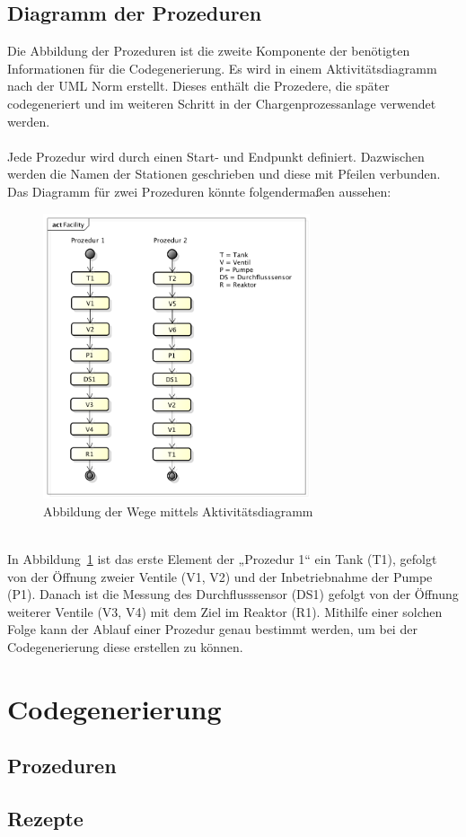 
\subsection{Diagramm der Prozeduren}
Die Abbildung der Prozeduren ist die zweite Komponente der benötigten Informationen für die Codegenerierung. Es wird in einem Aktivitätsdiagramm nach der UML Norm erstellt. Dieses enthält die Prozedere, die später codegeneriert und im weiteren Schritt in der Chargenprozessanlage verwendet werden. \\\\
Jede Prozedur wird durch einen Start- und Endpunkt definiert. Dazwischen werden die Namen der Stationen geschrieben und diese mit Pfeilen verbunden. Das Diagramm für zwei Prozeduren könnte folgendermaßen aussehen: 
\begin{figure}[h!]
		\centering
		\includegraphics[width=0.7\textwidth]{graphics/konzept/UML_Activity.png}
		\caption{Abbildung der Wege mittels Aktivitätsdiagramm}
		\label{fig:konz_UML_Activity}
\end{figure}\\
In Abbildung~\ref{fig:konz_UML_Activity} ist das erste Element der „Prozedur 1“ ein Tank (T1), gefolgt von der Öffnung zweier Ventile (V1, V2) und der Inbetriebnahme der Pumpe (P1). Danach ist die Messung des Durchflusssensor (DS1) gefolgt von der Öffnung weiterer Ventile (V3, V4) mit dem Ziel im Reaktor (R1). 
Mithilfe einer solchen Folge kann der Ablauf einer Prozedur genau bestimmt werden, um bei der Codegenerierung diese erstellen zu können. 
\section{Codegenerierung}
\subsection{Prozeduren}
\subsection{Rezepte}

